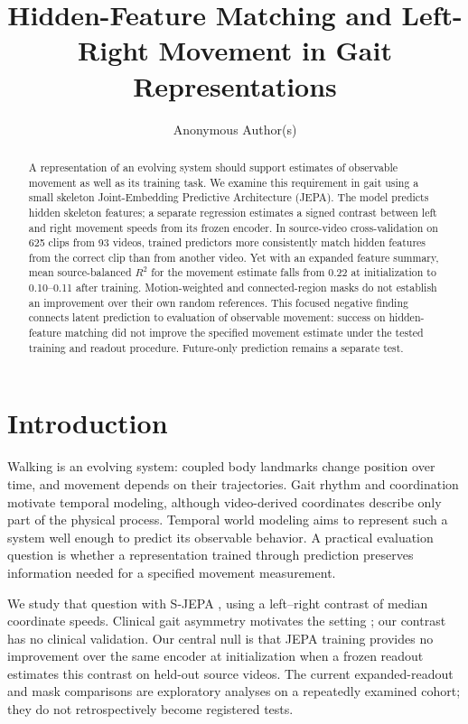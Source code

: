 \documentclass{article}
\title{Hidden-Feature Matching and Left-Right Movement in Gait Representations}
\author{Anonymous Author(s)}
\begin{document}
\maketitle
\begin{abstract}
A representation of an evolving system should support estimates of
observable movement as well as its training task. We examine this
requirement in gait using a small skeleton Joint-Embedding Predictive
Architecture (JEPA). The model predicts hidden skeleton features; a
separate regression estimates a signed contrast between left and right
movement speeds from its frozen encoder. In source-video
cross-validation on 625 clips from 93 videos, trained predictors more
consistently match hidden features from the correct clip than from
another video. Yet with an expanded feature summary, mean
source-balanced \(R^2\) for the movement estimate falls from 0.22 at
initialization to 0.10--0.11 after training. Motion-weighted and
connected-region masks do not establish an improvement over their own
random references. This focused negative finding connects latent
prediction to evaluation of observable movement: success on
hidden-feature matching did not improve the specified movement estimate
under the tested training and readout procedure. Future-only prediction
remains a separate test.
\end{abstract}
\section{Introduction}\label{introduction}

Walking is an evolving system: coupled body landmarks change position
over time, and movement depends on their trajectories. Gait rhythm and
coordination motivate temporal modeling, although video-derived
coordinates describe only part of the physical process. Temporal world
modeling aims to represent such a system well enough to predict its
observable behavior. A practical evaluation question is whether a
representation trained through prediction preserves information needed
for a specified movement measurement.

We study that question with S-JEPA \citep{sjepa}, using a left--right
contrast of median coordinate speeds. Clinical gait asymmetry motivates
the setting \citep{stroke}; our contrast has no clinical validation. Our
central null is that JEPA training provides no improvement over the same
encoder at initialization when a frozen readout estimates this contrast
on held-out source videos. The current expanded-readout and mask
comparisons are exploratory analyses on a repeatedly examined cohort;
they do not retrospectively become registered tests.
\end{document}
